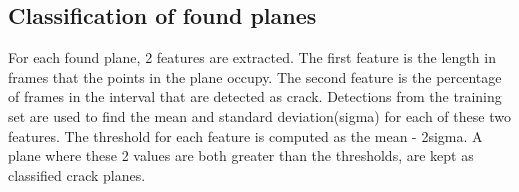     
    \subsection{Classification of found planes}
             For each found plane,  2 features are extracted. The first feature is the length in frames that the points in the plane occupy.  The second feature is the percentage of frames in the interval that are detected as crack. Detections from the training set are used to find the mean and standard deviation(sigma) for each of these two features.  The threshold for each feature is computed as the mean - 2sigma.    A plane  where these 2 values are both greater than the thresholds, are kept as classified crack planes.  
         

